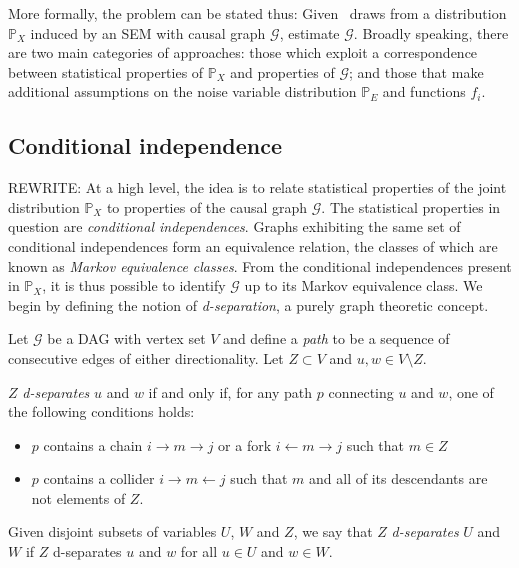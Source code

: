 More formally, the problem can be stated thus: Given \iid~draws from a distribution $\mathbb{P}_X$ induced by an SEM with causal graph $\mathcal{G}$, estimate $\mathcal{G}$.
Broadly speaking, there are two main categories of approaches: those which exploit a correspondence between statistical properties of $\mathbb{P}_X$ and properties of $\mathcal{G}$; and those that make additional assumptions on the noise variable distribution $\mathbb{P}_E$ and functions $f_i$.

\subsection{Conditional independence}

REWRITE:
At a high level, the idea is to relate statistical properties of the joint distribution $\mathbb{P}_X$ to properties of the causal graph $\mathcal{G}$.
The statistical properties in question are \emph{conditional independences}.
Graphs exhibiting the same set of conditional independences form an equivalence relation, the classes of which are known as \emph{Markov equivalence classes}.
From the conditional independences present in $\mathbb{P}_X$, it is thus possible to identify $\mathcal{G}$ up to its Markov equivalence class.
We begin by defining the notion of \emph{d-separation}, a purely graph theoretic concept. 
\\

\begin{definition}[d-separation]\label{def:d-sep}\citep{pearl2009causality}
Let $\mathcal{G}$ be a DAG with vertex set $V$ and define a \emph{path} to be a sequence of consecutive edges of either directionality. 
Let $Z \subset V$ and $u, w \in V \setminus Z$. 

$Z$ \emph{d-separates} $u$ and $w$ if and only if, for any path $p$
connecting $u$ and $w$, one of the following conditions holds:

\begin{itemize}
\item $p$ contains a chain $i \rightarrow m \rightarrow j$ or a fork $i \leftarrow m \rightarrow j$ such that $m \in Z$
\item $p$ contains a collider $i \rightarrow m \leftarrow j$ such that $m$ and all of its descendants
are not elements of $Z$.
\end{itemize}

Given disjoint subsets of variables $U$, $W$ and $Z$, we say that $Z$ \emph{d-separates} $U$ and $W$ if $Z$ d-separates $u$ and $w$ for all $u \in U$ and $w \in W$.
\end{definition}

